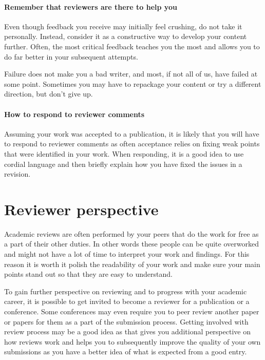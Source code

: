\paragraph{Remember that reviewers are there to help you}

Even though feedback you receive may initially feel crushing, do not take it personally.
Instead, consider it as a constructive way to develop your content further.
Often, the most critical feedback teaches you the most and allows you to do far better in your subsequent attempts.

Failure does not make you a bad writer, and most, if not all of us, have failed at some point.
Sometimes you may have to repackage your content or try a different direction, but don't give up.

\paragraph{How to respond to reviewer comments}

Assuming your work was accepted to a publication, it is likely that you will have to respond to reviewer comments as often acceptance relies on fixing weak points that were identified in your work.
When responding, it is a good idea to use cordial language and then briefly explain how you have fixed the issues in a revision.

\section{Reviewer perspective}

Academic reviews are often performed by your peers that do the work for free as a part of their other duties.
In other words these people can be quite overworked and might not have a lot of time to interpret your work and findings.
For this reason it is worth it polish the readability of your work and make sure your main points stand out so that they are easy to understand.

To gain further perspective on reviewing and to progress with your academic career, it is possible to get invited to become a reviewer for a publication or a conference.
Some conferences may even require you to peer review another paper or papers for them as a part of the submission process.
Getting involved with review process may be a good idea as that gives you additional perspective on how reviews work and helps you to subsequently improve the quality of your own submissions as you have a better idea of what is expected from a good entry.

